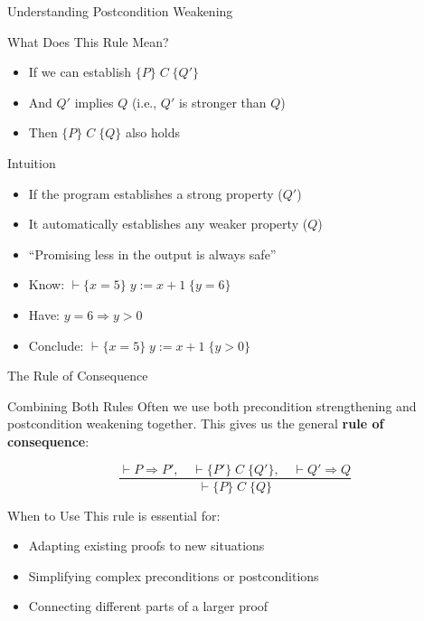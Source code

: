 \begin{frame}{Understanding Postcondition Weakening}
    \begin{block}{What Does This Rule Mean?}
        \begin{itemize}
            \item If we can establish $\{P\} \; C \; \{Q'\}$
            \item And $Q'$ implies $Q$ (i.e., $Q'$ is stronger than $Q$)
            \item Then $\{P\} \; C \; \{Q\}$ also holds
        \end{itemize}
    \end{block}

    \begin{block}{Intuition}
        \begin{itemize}
            \item If the program establishes a strong property ($Q'$)
            \item It automatically establishes any weaker property ($Q$)
            \item ``Promising less in the output is always safe''
        \end{itemize}
    \end{block}

    \begin{example}
        \begin{itemize}
            \item Know: $\vdash \{x = 5\} \; y := x + 1 \; \{y = 6\}$
            \item Have: $y = 6 \Rightarrow y > 0$
            \item Conclude: $\vdash \{x = 5\} \; y := x + 1 \; \{y > 0\}$
        \end{itemize}
    \end{example}
\end{frame}

\begin{frame}{The Rule of Consequence}
    \begin{block}{Combining Both Rules}
        Often we use both precondition strengthening and postcondition weakening together. This gives us the general \textbf{rule of consequence}:

        \[ \frac{\vdash P \Rightarrow P', \quad \vdash \{P'\} \; C \; \{Q'\}, \quad \vdash Q' \Rightarrow Q}{\vdash \{P\} \; C \; \{Q\}} \]
    \end{block}

    \begin{block}{When to Use}
        This rule is essential for:
        \begin{itemize}
            \item Adapting existing proofs to new situations
            \item Simplifying complex preconditions or postconditions
            \item Connecting different parts of a larger proof
        \end{itemize}
    \end{block}
\end{frame}

